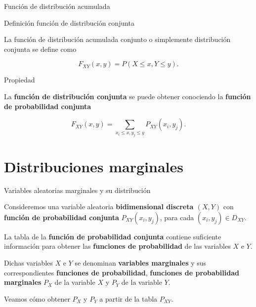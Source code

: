 \documentclass[ignorenonframetext,]{beamer}
\begin{document}
\begin{frame}{Función de distribución acumulada}
\protect\hypertarget{funciuxf3n-de-distribuciuxf3n-acumulada}{}

 Definición función de distribución conjunta

La función de distribución acumulada conjunto o simplemente distribución
conjunta se define como

\[F_{XY}(x,y)=P(X\leq x,Y\leq y).\]

 Propiedad

La \textbf{función de distribución conjunta} se puede obtener conociendo
la \textbf{función de probabilidad conjunta}

\[
F_{XY}(x,y)=\sum_{x_i\leq x, y_j\leq y} P_{XY}(x_i,y_j).
\]

\end{frame}

\hypertarget{distribuciones-marginales}{%
\section{Distribuciones marginales}\label{distribuciones-marginales}}

\begin{frame}{Variables aleatorias marginales y su distribución}
\protect\hypertarget{variables-aleatorias-marginales-y-su-distribuciuxf3n}{}

Consideremos una variable aleatoria \textbf{bidimensional discreta
\((X,Y)\)} con \textbf{función de probabilidad conjunta}
\(P_{XY}(x_i,y_j)\), para cada \((x_i,y_j)\in D_{XY}\).

La tabla de la \textbf{función de probabilidad conjunta} contiene
suficiente información para obtener las \textbf{funciones de
probabilidad} de las variables \(X\) e \(Y\).

Dichas variables \(X\) e \(Y\) se denominan \textbf{variables
marginales} y sus correspondientes \textbf{funciones de probabilidad},
\textbf{funciones de probabilidad marginales} \(P_X\) de la variable
\(X\) y \(P_Y\) de la variable \(Y\).

Veamos cómo obtener \(P_X\) y \(P_Y\) a partir de la tabla \(P_{XY}\).

\end{frame}
\end{document}
